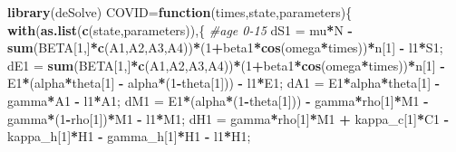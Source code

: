 \documentclass[
]{article}
\newenvironment{Shaded}{\begin{snugshade}}{\end{snugshade}}
\newcommand{\CommentTok}[1]{\textcolor[rgb]{0.56,0.35,0.01}{\textit{#1}}}
\newcommand{\ControlFlowTok}[1]{\textcolor[rgb]{0.13,0.29,0.53}{\textbf{#1}}}
\newcommand{\DecValTok}[1]{\textcolor[rgb]{0.00,0.00,0.81}{#1}}
\newcommand{\KeywordTok}[1]{\textcolor[rgb]{0.13,0.29,0.53}{\textbf{#1}}}
\newcommand{\NormalTok}[1]{#1}
\newcommand{\OperatorTok}[1]{\textcolor[rgb]{0.81,0.36,0.00}{\textbf{#1}}}
\newcommand{\StringTok}[1]{\textcolor[rgb]{0.31,0.60,0.02}{#1}}
\begin{document}
\begin{Shaded}
\begin{Highlighting}[]
\KeywordTok{library}\NormalTok{(deSolve)}
\NormalTok{COVID=}\ControlFlowTok{function}\NormalTok{(times,state,parameters)\{}
  \KeywordTok{with}\NormalTok{(}\KeywordTok{as.list}\NormalTok{(}\KeywordTok{c}\NormalTok{(state,parameters)),\{}
  \CommentTok{#age 0-15}
\NormalTok{    dS1 =}\StringTok{ }\NormalTok{mu}\OperatorTok{*}\NormalTok{N }\OperatorTok{-}\StringTok{ }\KeywordTok{sum}\NormalTok{(BETA[}\DecValTok{1}\NormalTok{,]}\OperatorTok{*}\KeywordTok{c}\NormalTok{(A1,A2,A3,A4))}\OperatorTok{*}\NormalTok{(}\DecValTok{1}\OperatorTok{+}\NormalTok{beta1}\OperatorTok{*}\KeywordTok{cos}\NormalTok{(omega}\OperatorTok{*}\NormalTok{times))}\OperatorTok{*}\NormalTok{n[}\DecValTok{1}\NormalTok{] }\OperatorTok{-}\StringTok{ }\NormalTok{l1}\OperatorTok{*}\NormalTok{S1;}
\NormalTok{    dE1 =}\StringTok{ }\KeywordTok{sum}\NormalTok{(BETA[}\DecValTok{1}\NormalTok{,]}\OperatorTok{*}\KeywordTok{c}\NormalTok{(A1,A2,A3,A4))}\OperatorTok{*}\NormalTok{(}\DecValTok{1}\OperatorTok{+}\NormalTok{beta1}\OperatorTok{*}\KeywordTok{cos}\NormalTok{(omega}\OperatorTok{*}\NormalTok{times))}\OperatorTok{*}\NormalTok{n[}\DecValTok{1}\NormalTok{] }\OperatorTok{-}\StringTok{ }\NormalTok{E1}\OperatorTok{*}\NormalTok{(alpha}\OperatorTok{*}\NormalTok{theta[}\DecValTok{1}\NormalTok{] }\OperatorTok{-}\StringTok{ }\NormalTok{alpha}\OperatorTok{*}\NormalTok{(}\DecValTok{1}\OperatorTok{-}\NormalTok{theta[}\DecValTok{1}\NormalTok{])) }\OperatorTok{-}\StringTok{ }\NormalTok{l1}\OperatorTok{*}\NormalTok{E1;}
\NormalTok{    dA1 =}\StringTok{ }\NormalTok{E1}\OperatorTok{*}\NormalTok{alpha}\OperatorTok{*}\NormalTok{theta[}\DecValTok{1}\NormalTok{] }\OperatorTok{-}\StringTok{ }\NormalTok{gamma}\OperatorTok{*}\NormalTok{A1 }\OperatorTok{-}\StringTok{ }\NormalTok{l1}\OperatorTok{*}\NormalTok{A1;}
\NormalTok{    dM1 =}\StringTok{ }\NormalTok{E1}\OperatorTok{*}\NormalTok{(alpha}\OperatorTok{*}\NormalTok{(}\DecValTok{1}\OperatorTok{-}\NormalTok{theta[}\DecValTok{1}\NormalTok{])) }\OperatorTok{-}\StringTok{ }\NormalTok{gamma}\OperatorTok{*}\NormalTok{rho[}\DecValTok{1}\NormalTok{]}\OperatorTok{*}\NormalTok{M1 }\OperatorTok{-}\StringTok{ }\NormalTok{gamma}\OperatorTok{*}\NormalTok{(}\DecValTok{1}\OperatorTok{-}\NormalTok{rho[}\DecValTok{1}\NormalTok{])}\OperatorTok{*}\NormalTok{M1 }\OperatorTok{-}\StringTok{ }\NormalTok{l1}\OperatorTok{*}\NormalTok{M1;}
\NormalTok{    dH1 =}\StringTok{ }\NormalTok{gamma}\OperatorTok{*}\NormalTok{rho[}\DecValTok{1}\NormalTok{]}\OperatorTok{*}\NormalTok{M1 }\OperatorTok{+}\StringTok{ }\NormalTok{kappa_c[}\DecValTok{1}\NormalTok{]}\OperatorTok{*}\NormalTok{C1 }\OperatorTok{-}\StringTok{ }\NormalTok{kappa_h[}\DecValTok{1}\NormalTok{]}\OperatorTok{*}\NormalTok{H1 }\OperatorTok{-}\StringTok{ }\NormalTok{gamma_h[}\DecValTok{1}\NormalTok{]}\OperatorTok{*}\NormalTok{H1 }\OperatorTok{-}\StringTok{ }\NormalTok{l1}\OperatorTok{*}\NormalTok{H1;}

\end{Highlighting}
\end{Shaded}
\end{document}
